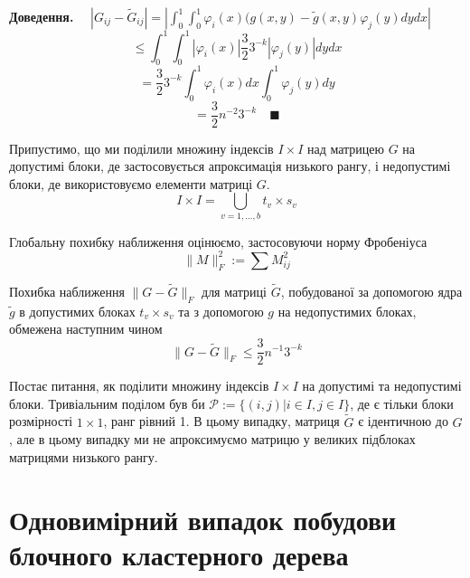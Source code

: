 \documentclass[12pt]{report}
\begin{document}
	{\bf Доведення.} $\quad|G_{ij}-\tilde{G}_{ij}|=|\int_{0}^{1}\int_{0}^{1}\varphi_i(x)(g(x,y)-\tilde{g}(x,y)\varphi_j(y)dydx|$
	$$\le \int_{0}^{1}\int_{0}^{1}|\varphi_i(x)|\frac{3}{2}3^{-k}|\varphi_j(y)|dydx$$
	$$=\frac{3}{2}3^{-k}\int_{0}^{1}\varphi_i(x)dx\int_{0}^{1}\varphi_j(y)dy$$
	$$= \frac{3}{2}n^{-2}3^{-k} \quad\blacksquare$$ 
	\par Припустимо, що ми поділили множину індексів $I\times I$ над матрицею $G$ на допустимі блоки, де застосовується апроксимація низького рангу, і недопустимі блоки, де використовуємо елементи матриці $G$.
	$$I\times I=\bigcup_{v=1,\dots,b}t_v\times s_v$$
	\par Глобальну похибку наближення оцінюємо, застосовуючи норму Фробеніуса 
	$$\|M\|^2_F:=\sum M_{ij}^2$$
	\begin{Lem}
	Похибка наближення $\|G-\tilde{G}\|_F$ для матриці $\tilde{G}$, побудованої за допомогою ядра $\tilde{g}$ в допустимих блоках $t_v\times s_v$ та з допомогою $g$ на недопустимих блоках, обмежена наступним чином
	$$\|G-\tilde{G}\|_F\le \frac{3}{2}n^{-1}3^{-k}$$
	\end{Lem}
	\par Постає питання, як поділити множину індексів $I\times I$ на допустимі та недопустимі блоки. Тривіальним поділом був би $\mathcal{P}:=\{(i,j)|i\in I,j\in I\}$, де є тільки блоки розмірності $1\times 1$, ранг рівний 1. В цьому випадку, матриця $\tilde{G}$ є ідентичною до $G$, але в цьому випадку ми не апроксимуємо матрицю у великих підблоках матрицями низького рангу. 
	\section{Одновимірний випадок побудови блочного кластерного дерева}
\end{document}
